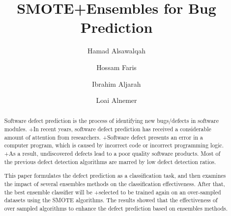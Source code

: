 \documentclass[runningheads,a4paper]{llncs}
\newcommand{\keywords}[1]{\par\addvspace\baselineskip
\noindent\keywordname\enspace\ignorespaces#1}
\begin{document}
\mainmatter  %

\title{SMOTE+Ensembles for Bug Prediction}


%
%
\author{ Hamad Alsawalqah  \and Hossam Faris \and Ibrahim Aljarah \and Loai Alnemer}%

%

\institute{King Abdullah II School for Information Technology\\
The University of Jordan\\
Amman, Jordan\\
\mailsa\\
}
%
%

\maketitle


\begin{abstract}
Software defect prediction is the process of identifying new bugs/defects in software modules.
 +In recent years, software defect prediction has received a considerable amount of attention from researchers.
 +Software defect presents an error in a computer program, which is caused by incorrect code or incorrect programming logic. 
 +As a result, undiscovered defects lead to a poor quality software products. Most of the previous defect detection algorithms are marred by low defect detection ratios. 
 
 
 This paper formulates the defect prediction as a classification task, and then examines the impact of several ensembles methods on the classification effectiveness. After that, the best ensemble classifier will be 
 +selected to be trained again on an over-sampled datasets using the SMOTE algorithms. The results showed that the effectiveness of over sampled algorithms to enhance the defect prediction based on ensembles methods.
 


\keywords{}
\end{abstract}
\end{document}
